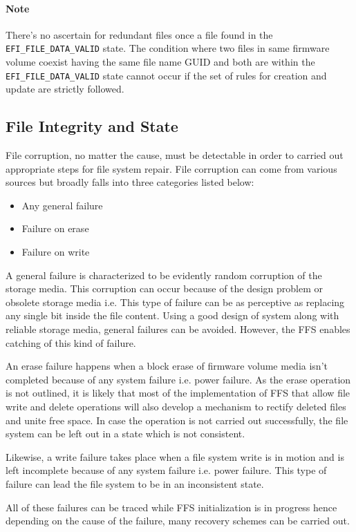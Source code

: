 

\paragraph{Note} There's no ascertain for redundant files once a file found in the \verb|EFI_FILE_DATA_VALID| state. The condition where two files in same firmware volume coexist having the same file name GUID and both are within the \verb|EFI_FILE_DATA_VALID| state cannot occur if the set of rules for creation and update are strictly followed.

\subsection{File Integrity and State}
File corruption, no matter the cause, must be detectable in order to carried out appropriate steps for file system repair. File corruption can come from various sources but broadly falls into three categories listed below:
\begin{itemize}
	\item Any general failure
	\item Failure on erase
	\item Failure on write
\end{itemize}

A general failure is characterized to be evidently random corruption of the storage media. This corruption can occur because of the design problem or obsolete storage media i.e. This type of failure can be as perceptive as replacing any single bit inside the file content. Using a good design of system along with reliable storage media, general failures can be avoided. However, the FFS enables catching of this kind of failure.

An erase failure happens when a block erase of firmware volume media isn't completed because of any system failure i.e. power failure. As the erase operation is not outlined, it is likely that most of the implementation of FFS that allow file write and delete operations will also develop a mechanism to rectify deleted files and unite free space. In case the operation is not carried out successfully, the file system can be left out in a state which is not consistent. 

Likewise, a write failure takes place when a file system write is in motion and is left incomplete because of any system failure i.e. power failure. This type of failure can lead the file system to be in an inconsistent state.

All of these failures can be traced while FFS initialization is in progress hence depending on the cause of the failure, many recovery schemes can be carried out.



